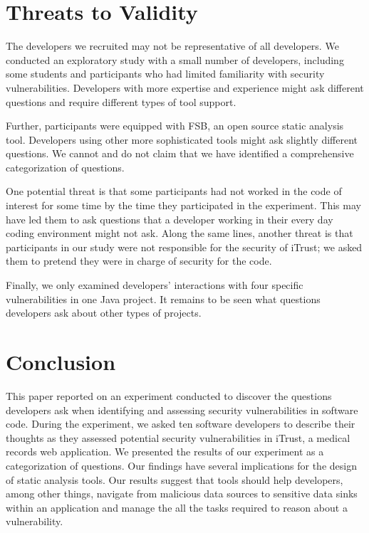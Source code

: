 \documentclass{acm_proc_article-sp}
\begin{document}
\section{Threats to Validity}
\label{limits}
The developers we recruited may not be representative of all developers.
We conducted an exploratory study with a small number of developers, including some students and participants who had limited familiarity with security vulnerabilities.
Developers with more expertise and experience might ask different questions and require different types of tool support.

Further, participants were equipped with FSB, an open source static analysis tool. 
Developers using other more sophisticated tools might ask slightly different questions.
We cannot and do not claim that we have identified a comprehensive categorization of questions.

One potential threat is that some participants had not worked in the code of interest for some time by the time they participated in the experiment. This may have led them to ask questions that a developer working in their every day coding environment might not ask. 
Along the same lines, another threat is that participants in our study were not responsible for the security of iTrust; we asked them to pretend they were in charge of security for the code.  

Finally, we only examined developers' interactions with four specific vulnerabilities in one Java project. 
It remains to be seen what questions developers ask about other types of projects.



\section{Conclusion}
\label{sec:concl}
This paper reported on an experiment conducted to discover the questions developers ask when identifying and assessing security vulnerabilities in software code.
During the experiment, we asked ten software developers to describe their thoughts as they assessed potential security vulnerabilities in iTrust, a medical records web application.
We presented the results of our experiment as a categorization of questions.
Our findings have several implications for the design of static analysis tools. Our results suggest that tools should help developers, among other things, navigate from malicious data sources to sensitive data sinks within an application and manage the all the tasks required to reason about a vulnerability.
\end{document}
